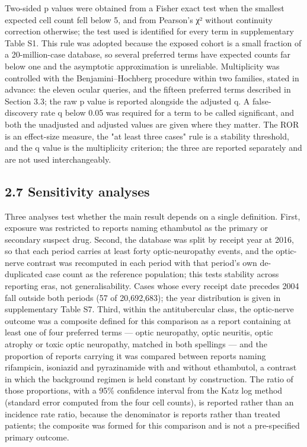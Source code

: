 \documentclass[12pt,a4paper]{article}
\begin{document}
Two-sided p values were obtained from a Fisher exact test when the smallest expected cell count fell below 5, and from Pearson's χ² without continuity correction otherwise; the test used is identified for every term in supplementary Table S1. This rule was adopted because the exposed cohort is a small fraction of a 20-million-case database, so several preferred terms have expected counts far below one and the asymptotic approximation is unreliable. Multiplicity was controlled with the Benjamini–Hochberg procedure within two families, stated in advance: the eleven ocular queries, and the fifteen preferred terms described in Section 3.3; the raw p value is reported alongside the adjusted q. A false-discovery rate q below 0.05 was required for a term to be called significant, and both the unadjusted and adjusted values are given where they matter. The ROR is an effect-size measure, the "at least three cases" rule is a stability threshold, and the q value is the multiplicity criterion; the three are reported separately and are not used interchangeably.

\subsection*{2.7 Sensitivity analyses}

Three analyses test whether the main result depends on a single definition. First, exposure was restricted to reports naming ethambutol as the primary or secondary suspect drug. Second, the database was split by receipt year at 2016, so that each period carries at least forty optic-neuropathy events, and the optic-nerve contrast was recomputed in each period with that period's own de-duplicated case count as the reference population; this tests stability across reporting eras, not generalisability. Cases whose every receipt date precedes 2004 fall outside both periods (57 of 20,692,683); the year distribution is given in supplementary Table S7. Third, within the antitubercular class, the optic-nerve outcome was a composite defined for this comparison as a report containing at least one of four preferred terms — optic neuropathy, optic neuritis, optic atrophy or toxic optic neuropathy, matched in both spellings — and the proportion of reports carrying it was compared between reports naming rifampicin, isoniazid and pyrazinamide with and without ethambutol, a contrast in which the background regimen is held constant by construction. The ratio of those proportions, with a 95\% confidence interval from the Katz log method (standard error computed from the four cell counts), is reported rather than an incidence rate ratio, because the denominator is reports rather than treated patients; the composite was formed for this comparison and is not a pre-specified primary outcome.
\end{document}
